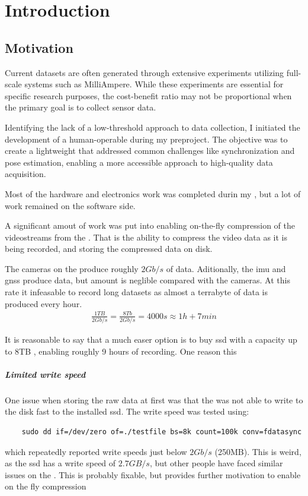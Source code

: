 \chapter{Introduction}

\section{Motivation}
Current datasets are often generated through extensive experiments utilizing full-scale systems such as MilliAmpere. While these experiments are essential for specific research purposes, the cost-benefit ratio may not be proportional when the primary goal is to collect sensor data.

Identifying the lack of a low-threshold approach to data collection, I initiated the development of a human-operable \sr during my preproject. The objective was to create a lightweight \sr that addressed common challenges like synchronization and pose estimation, enabling a more accessible approach to high-quality data acquisition.

Most of the hardware and electronics work was completed durin my \preproject, but a lot of work remained on the software side.

A significant amout of work was put into enabling on-the-fly compression of the videostreams from the \sr.
That is the ability to compress the video data as it is being recorded, and storing the compressed data on disk.

The cameras on the \sr produce roughly $2Gb/s$ of data.
Aditionally, the \gls{imu} and \gls{gnss} produce data, but amount is neglible compared with the cameras.
At this rate it infeasable to record long datasets as almost a terrabyte of data is produced every hour.
\begin{align}
    \frac{1TB}{2Gb/s}  = \frac{8Tb}{2Gb/s} = 4000s \approx 1h + 7min
\end{align}

It is reasonable to say that a much easer option is to buy \gls{ssd} with a capacity up to 8TB \cite{CorsairMP600PRO}, enabling roughly 9 hours of recording.
One reason this
\cite{microntechnologyMicron2300SSD2020}

\paragraph{Limited write speed}
One issue when storing the raw data at first was that the \jx was not able to write to the disk fast to the installed \gls{ssd}.
The write speed was tested using:
\begin{verbatim}
    sudo dd if=/dev/zero of=./testfile bs=8k count=100k conv=fdatasync
\end{verbatim}
which repeatedly reported write speeds just below $2Gb/s$ (250MB).
This is weird, as the \gls{ssd} has a write speed of $2.7GB/s$, but other people have faced similar issues on the \jx \cite{microntechnologyMicron2300SSD2020} \cite{dtyuImbalancedPerformanceRead2018}.
This is probably fixable, but provides further motivation to enable on the fly compression

